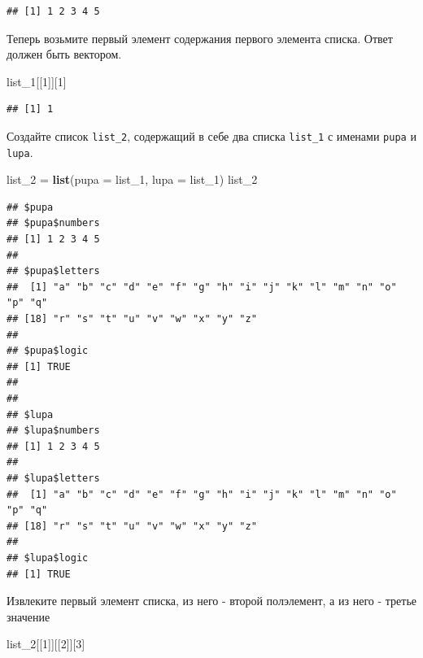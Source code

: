 \documentclass[]{book}
\newenvironment{Shaded}{\begin{snugshade}}{\end{snugshade}}
\newcommand{\DataTypeTok}[1]{\textcolor[rgb]{0.13,0.29,0.53}{#1}}
\newcommand{\DecValTok}[1]{\textcolor[rgb]{0.00,0.00,0.81}{#1}}
\newcommand{\KeywordTok}[1]{\textcolor[rgb]{0.13,0.29,0.53}{\textbf{#1}}}
\newcommand{\NormalTok}[1]{#1}
\newcommand{\StringTok}[1]{\textcolor[rgb]{0.31,0.60,0.02}{#1}}
\begin{document}
\begin{verbatim}
## [1] 1 2 3 4 5
\end{verbatim}

Теперь возьмите первый элемент содержания первого элемента списка. Ответ должен быть вектором.

\begin{Shaded}
\begin{Highlighting}[]
\NormalTok{list_}\DecValTok{1}\NormalTok{[[}\DecValTok{1}\NormalTok{]][}\DecValTok{1}\NormalTok{]}
\end{Highlighting}
\end{Shaded}

\begin{verbatim}
## [1] 1
\end{verbatim}

Создайте список \texttt{list\_2}, содержащий в себе два списка \texttt{list\_1} с именами \texttt{pupa} и \texttt{lupa}.

\begin{Shaded}
\begin{Highlighting}[]
\NormalTok{list_}\DecValTok{2}\NormalTok{ =}\StringTok{ }\KeywordTok{list}\NormalTok{(}\DataTypeTok{pupa =}\NormalTok{ list_}\DecValTok{1}\NormalTok{, }\DataTypeTok{lupa =}\NormalTok{ list_}\DecValTok{1}\NormalTok{)}
\NormalTok{list_}\DecValTok{2}
\end{Highlighting}
\end{Shaded}

\begin{verbatim}
## $pupa
## $pupa$numbers
## [1] 1 2 3 4 5
## 
## $pupa$letters
##  [1] "a" "b" "c" "d" "e" "f" "g" "h" "i" "j" "k" "l" "m" "n" "o" "p" "q"
## [18] "r" "s" "t" "u" "v" "w" "x" "y" "z"
## 
## $pupa$logic
## [1] TRUE
## 
## 
## $lupa
## $lupa$numbers
## [1] 1 2 3 4 5
## 
## $lupa$letters
##  [1] "a" "b" "c" "d" "e" "f" "g" "h" "i" "j" "k" "l" "m" "n" "o" "p" "q"
## [18] "r" "s" "t" "u" "v" "w" "x" "y" "z"
## 
## $lupa$logic
## [1] TRUE
\end{verbatim}

Извлеките первый элемент списка, из него - второй полэлемент, а из него - третье значение

\begin{Shaded}
\begin{Highlighting}[]
\NormalTok{list_}\DecValTok{2}\NormalTok{[[}\DecValTok{1}\NormalTok{]][[}\DecValTok{2}\NormalTok{]][}\DecValTok{3}\NormalTok{]}
\end{Highlighting}
\end{Shaded}
\end{document}
